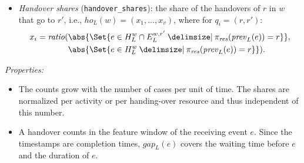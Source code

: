 \begin{definition}
\begin{itemize}
		      \[
			      x_i = \mathit{ratio}(\abs{\Set{e \in E^{w,r}_L \given \pi_{\mathit{act}}(e) = a}}, \abs{\Set{e \in E^w_L \given \pi_{\mathit{act}}(e) = a}}).
		      \]
		\item \emph{Handover shares} (\texttt{handover\_shares}): the share of the handovers of $r$ in $w$ that go to $r'$, i.e., $\mathit{ho}_L(w) = (x_1, \dots, x_v)$, where for $q_i = (r, r')$:
		      \[
			      \begin{aligned}
				      x_i = \mathit{ratio}( & \abs{\Set{e \in H^w_L \cap E^{w,r'}_L \given \pi_{\mathit{res}}(\mathit{prev}_L(e)) = r}}, \\
				                      & \abs{\Set{e \in H^w_L \given \pi_{\mathit{res}}(\mathit{prev}_L(e)) = r}}).
			      \end{aligned}
		      \]
	\end{itemize}
\end{definition}

\noindent\emph{Properties:}
\begin{itemize}[beginpenalty=10000]
	\item The counts grow with the number of cases per unit of time. The shares are normalized per activity or per handing-over resource and thus independent of this number.
	\item A handover counts in the feature window of the receiving event $e$. Since the timestamps are completion times, $\mathit{gap}_L(e)$ covers the waiting time before $e$ and the duration of $e$.
\end{itemize}

